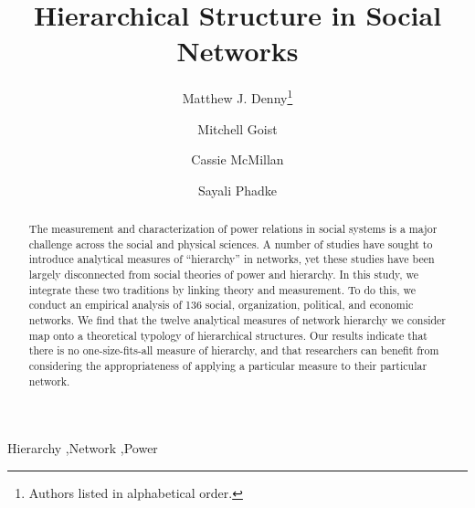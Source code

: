 \documentclass[3p,times]{elsarticle}
\begin{document}
\begin{frontmatter}




\title{Hierarchical Structure in Social Networks}


\author[au1]{Matthew J. Denny\footnote{Authors listed in alphabetical order.}} 
\author[au2]{Mitchell Goist}
\author[au3]{Cassie McMillan} 
\author[au4]{Sayali Phadke}

\address[au1]{Department of Political Science, mdenny@psu.edu}
\address[au2]{Department of Political Science mlg307@psu.edu}
\address[au3]{Department of Sociology, clm453@psu.edu}
\address[au4]{Department of Statistics, ssp5208@psu.edu}

\begin{abstract}
The measurement and characterization of power relations in social systems is a major challenge across the social and physical sciences. A number of studies have sought to introduce analytical measures of ``hierarchy'' in networks, yet these studies have been largely disconnected from social theories of power and hierarchy. In this study, we integrate these two traditions by linking theory and measurement. To do this, we conduct an empirical analysis of 136 social, organization, political, and economic networks. We find that the twelve analytical measures of network hierarchy we consider map onto a theoretical typology of hierarchical structures. Our results indicate that there is no one-size-fits-all measure of hierarchy, and that researchers can benefit from considering the appropriateness of applying a particular measure to their particular network.
\end{abstract}

\begin{keyword}
Hierarchy \sep Network \sep Power


\end{keyword}

\end{frontmatter}
\end{document}
